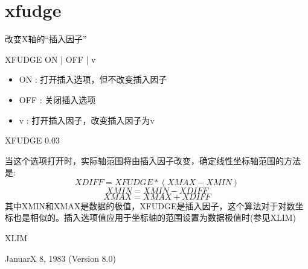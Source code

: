 \section{xfudge}
\label{cmd:xfudge}

改变X轴的``插入因子''

XFUDGE ON | OFF | v

\begin{itemize}
\item ON : 打开插入选项，但不改变插入因子 
\item OFF : 关闭插入选项 
\item v : 打开插入因子，改变插入因子为v 
\end{itemize}

XFUDGE 0.03

当这个选项打开时，实际轴范围将由插入因子改变，确定线性坐标轴范围的方法是:
\[ XDIFF=XFUDGE*(XMAX-XMIN) \]
\[ XMIN=XMIN-XDIFF \]
\[ XMAX=XMAX+XDIFF \]
其中XMIN和XMAX是数据的极值，XFUDGE是插入因子，这个算法对于对数坐标也是相似的。插入选项值应用于坐标轴的范围设置为数据极值时(参见XLIM)

XLIM

JanuarX 8, 1983 (Version 8.0)
